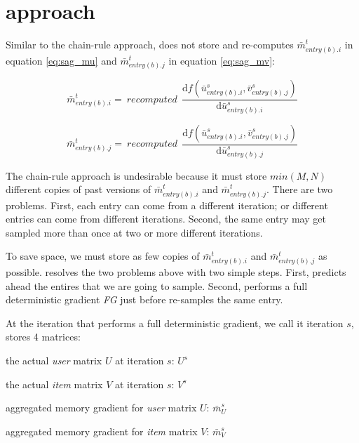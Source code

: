 \section{approach}
Similar to the chain-rule approach, \tool does not store and re-computes $\bar{m}_{entry(b).i}^{t}$ in equation \ref{eq:sag_mu} and $\bar{m}_{entry(b).j}^{t}$ in equation \ref{eq:sag_mv}:

\begin{equation} \label{eq:sagre_mi}
  \bar{m}_{entry(b).i}^{t} =\:recomputed\:\:\frac{\text{d}f(\bar{u}_{entry(b).i}^{s}, \bar{v}_{entry(b).j}^{s})}{\text{d}\bar{u}_{entry(b).i}^{s}}
\end{equation}

\begin{equation} \label{eq:sagre_mj}
  \bar{m}_{entry(b).j}^{t} =\:recomputed\:\:\frac{\text{d}f(\bar{u}_{entry(b).i}^{s}, \bar{v}_{entry(b).j}^{s})}{\text{d}\bar{u}_{entry(b).j}^{s}}
\end{equation}

The chain-rule approach is undesirable because it must store $min(M,N)$ different copies of past versions of $\bar{m}_{entry(b).i}^{t}$ and $\bar{m}_{entry(b).j}^{t}$.
There are two problems.  First, each entry can come from a different iteration; or different entries can come from different iterations.
Second, the same entry may get sampled more than once at two or more different iterations.


To save space, we must store as few copies of $\bar{m}_{entry(b).i}^{t}$ and $\bar{m}_{entry(b).j}^{t}$ as possible.
\tool resolves the two problems above with two simple steps.
First, \tool predicts ahead the entires that we are going to sample.
Second, \tool performs a full deterministic gradient \emph{FG} just before \tool re-samples the same entry.

At the iteration that \tool performs a full deterministic gradient, we call it iteration $s$, \tool stores 4 matrices:
\begin{sloppy}
\begin{compactenum}
\item the actual \emph{user} matrix $U$ at iteration $s$: $U^{s}$
\item the actual \emph{item} matrix $V$ at iteration $s$: $V^{s}$
\item aggregated memory gradient for \emph{user} matrix $U$: $\bar{m}_{U}^{s}$
\item aggregated memory gradient for \emph{item} matrix $V$: $\bar{m}_{V}^{s}$
\end{compactenum}
\end{sloppy}

